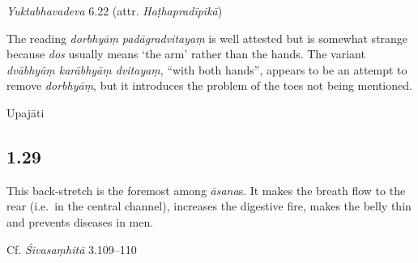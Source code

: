 \begin{ekdosis}
\begin{testimonia}[hp01_028]
\emph{Yuktabhavadeva} 6.22 (attr. \emph{Haṭhapradīpikā})

\begin{versinnote}
\end{versinnote}

\end{testimonia}

\begin{philcomm}[hp01_028]
The reading \emph{dorbhyāṃ padāgradvitayaṃ} is well attested but is somewhat strange because \emph{dos} usually means `the arm' rather than the hands. The variant \emph{dvābhyāṃ karābhyāṃ dvitayaṃ}, “with both hands”,  appears to be an attempt to remove \emph{dorbhyāṃ}, but it introduces the problem of the toes not being mentioned.
\end{philcomm}

\begin{metre}[hp01_028]
Upajāti
\end{metre}

\subsection*{1.29}
\begin{translation}[hp01_029]
This back-stretch is the foremost among \emph{āsana}s. It makes the breath flow to the rear (i.e.~in the central channel), increases the digestive fire, makes the belly thin and prevents diseases in men.
\end{translation}

\begin{sources}[hp01_029]
Cf. \emph{Śivasaṃhitā} 3.109–110

\begin{versinnote}
\end{versinnote}

\end{sources}


\end{ekdosis}
